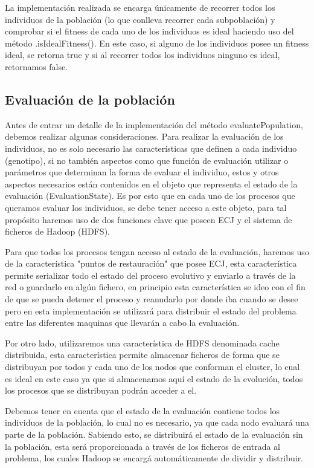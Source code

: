 La implementación realizada se encarga únicamente de recorrer todos los individuos de la población (lo que conlleva recorrer cada subpoblaci\'on) y comprobar si el fitness de cada uno de los individuos es ideal haciendo uso del método .isIdealFitness(). En este caso, si alguno de los individuos posee un fitness ideal, se retorna true y si al recorrer todos los individuos ninguno es ideal, retornamos false.

\subsection{Evaluación de la población}

Antes de entrar un detalle de la implementación del método evaluatePopulation, debemos realizar algunas consideraciones. Para realizar la evaluación de los individuos, no es solo necesario las características que definen a cada individuo (genotipo), si no también aspectos como que función de evaluación utilizar o parámetros que determinan la forma de evaluar el individuo, estos y otros aspectos necesarios est\'an contenidos en el objeto que representa el estado de la evaluación (EvaluationState). Es por esto que en cada uno de los procesos que queramos evaluar los individuos, se debe tener acceso a este objeto, para tal propósito haremos uso de dos funciones clave que poseen ECJ y el sistema de ficheros de Hadoop (HDFS).

Para que todos los procesos tengan acceso al estado de la evaluación, haremos uso de la característica "puntos de restauración" que posee ECJ, esta característica permite serializar todo el estado del proceso evolutivo y enviarlo a través de la red o guardarlo en algún fichero, en principio esta característica se ideo con el fin de que se pueda detener el proceso y reanudarlo por donde iba cuando se desee pero en esta implementación se utilizar\'a para distribuir el estado del problema entre las diferentes maquinas que llevar\'an a cabo la evaluación.

Por otro lado, utilizaremos una característica de HDFS denominada cache distribuida, esta característica permite almacenar ficheros de forma que se distribuyan por todos y cada uno de los nodos que conforman el cluster, lo cual es ideal en este caso ya que si almacenamos aquí el estado de la evolución, todos los procesos que se distribuyan podrán acceder a el.

Debemos tener en cuenta que el estado de la evaluación contiene todos los individuos de la población, lo cual no es necesario, ya que cada nodo evaluar\'a una parte de la población. Sabiendo esto, se distribuirá el estado de la evaluación sin la población, esta ser\'a proporcionada a través de los ficheros de entrada al problema, los cuales Hadoop se encarg\'a automáticamente de dividir y distribuir.

